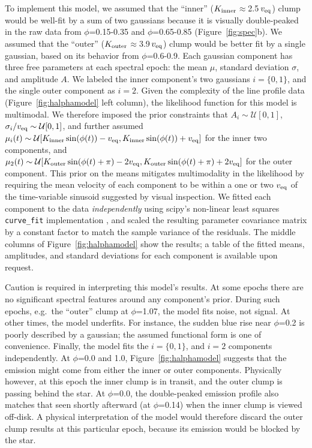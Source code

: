 \documentclass[11pt,twocolumn,tighten]{aastex7}
\begin{document}
To implement this model, we assumed that the ``inner'' ($K_{\rm
inner}$$\approx$2.5\,$v_{\rm eq}$) clump would be well-fit by a sum of
two gaussians because it is visually double-peaked in the raw data
from $\phi$=0.15-0.35 and $\phi$=0.65-0.85 (Figure~\ref{fig:spec}b).
We assumed that the ``outer'' ($K_{\rm outer}$$\approx$3.9\,$v_{\rm
eq}$) clump would be better fit by a single gaussian, based on its
behavior from $\phi$=0.6-0.9.  Each gaussian component has three free
parameters at each spectral epoch: the mean $\mu$, standard deviation
$\sigma$, and amplitude $A$.  We labeled the inner component's two
gaussians $i=\{ 0, 1 \}$, and the single outer component as $i=2$.
Given the complexity of the line profile data
(Figure~\ref{fig:halphamodel} left column), the likelihood function
for this model is multimodal.  We therefore imposed the prior
constraints that $A_i \sim \mathcal{U}[0,1]$,
$\sigma_i/v_{\rm eq} \sim \mathcal{U}[0,1]$, and further assumed
$\mu_i(t) \sim
\mathcal{U}[
  K_{\rm inner}\sin(\phi(t)) - v_{\rm eq},
  K_{\rm inner}\sin(\phi(t)) + v_{\rm eq}
]$
for the inner two components, and
$\mu_2(t) \sim
\mathcal{U}[
  K_{\rm outer}\sin(\phi(t) + \pi) - 2v_{\rm eq},
  K_{\rm outer}\sin(\phi(t) + \pi) + 2v_{\rm eq}
]$
for the outer component.  This prior on the means mitigates
multimodality in the likelihood by requiring the mean velocity of each
component to be within a one or two $v_{\rm eq}$ of the time-variable
sinusoid suggested by visual inspection.  We fitted each component to
the data {\it independently} using scipy's non-linear least squares
\texttt{curve\_fit} implementation \citep{Virtanen2020}, and scaled the
resulting parameter covariance matrix by a constant factor to match
the sample variance of the residuals.
The middle columns of
Figure~\ref{fig:halphamodel} show the results; a table of the fitted means,
amplitudes, and standard deviations for each component is available
upon request.

Caution is required in interpreting this model's results.  At some
epochs there are no significant spectral features around any component's
prior.  During such epochs, e.g.~the
``outer'' clump at $\phi$=1.07, the model fits noise, not signal.  At
other times, the model underfits.  For instance, the sudden blue rise
near $\phi$=0.2 is poorly described by a gaussian; the assumed
functional form is one of convenience.  Finally, the model fits the
$i=\{ 0, 1 \}$, and $i=2$ components independently.  At $\phi$=0.0 and
1.0, Figure~\ref{fig:halphamodel} suggests that the emission might
come from either the inner or outer components.  Physically however,
at this epoch the inner clump is in transit, and the outer clump is
passing behind the star.  At $\phi$=0.0, the double-peaked emission
profile also matches that seen shortly afterward (at $\phi$=0.14) when
the inner clump is viewed off-disk.  A physical interpretation of the
model would therefore discard the outer clump results at this
particular epoch, because its emission would be blocked by the star.
\end{document}
